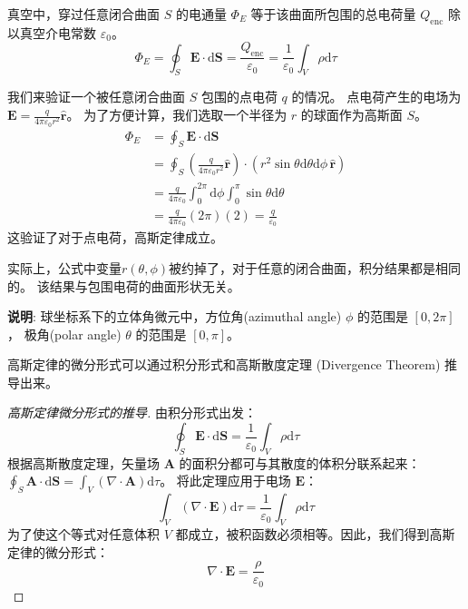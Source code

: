 \documentclass[fontset=none]{ctexart}
\begin{document}
\begin{law}
    真空中，穿过任意闭合曲面 $S$ 的电通量 $\Phi_E$ 等于该曲面所包围的总电荷量 $Q_{\text{enc}}$ 
    除以真空介电常数 $\varepsilon_0$。
    \begin{equation}
        \Phi_E = \oint_S \bm{E} \cdot \mathrm{d}\bm{S} = \frac{Q_{\text{enc}}}{\varepsilon_0} 
        = \frac{1}{\varepsilon_0} \int_V \rho \mathrm{d}\tau
    \end{equation}
\end{law}

\begin{example}[点电荷的电通量]
    我们来验证一个被任意闭合曲面 $S$ 包围的点电荷 $q$ 的情况。
    点电荷产生的电场为 $\bm{E} = \frac{q}{4\pi\varepsilon_0 r^2} \hat{\bm{r}}$。
    为了方便计算，我们选取一个半径为 $r$ 的球面作为高斯面 $S$。
    \begin{equation}
    \begin{aligned}
        \Phi_E &= \oint_S \bm{E} \cdot \mathrm{d}\bm{S} \\
        &= \oint_S \left(\frac{q}{4\pi\varepsilon_0 r^2} \hat{\bm{r}}\right) 
        \cdot (r^2 \sin\theta \mathrm{d}\theta \mathrm{d}\phi \, \hat{\bm{r}}) \\
        &= \frac{q}{4\pi\varepsilon_0} \int_{0}^{2\pi} \mathrm{d}\phi 
        \int_{0}^{\pi} \sin\theta \mathrm{d}\theta \\
        &= \frac{q}{4\pi\varepsilon_0} (2\pi) (2) = \frac{q}{\varepsilon_0}
    \end{aligned}
    \end{equation}
    这验证了对于点电荷，高斯定律成立。

    实际上，公式中变量$r(\theta, \phi)$被约掉了，对于任意的闭合曲面，积分结果都是相同的。
    该结果与包围电荷的曲面形状无关。

    \textbf{说明}: 球坐标系下的立体角微元中，方位角(azimuthal angle) $\phi$ 的范围是 $[0, 2\pi]$，
    极角(polar angle) $\theta$ 的范围是 $[0, \pi]$。
\end{example}

高斯定律的微分形式可以通过积分形式和高斯散度定理 (Divergence Theorem) 推导出来。
\begin{proof}[高斯定律微分形式的推导]
    由积分形式出发：
    \begin{equation}
        \oint_S \bm{E} \cdot \mathrm{d}\bm{S} = \frac{1}{\varepsilon_0} \int_V \rho \mathrm{d}\tau
    \end{equation}
    根据高斯散度定理，矢量场 $\bm{A}$ 的面积分都可与其散度的体积分联系起来： 
    $\oint_S \bm{A} \cdot \mathrm{d}\bm{S} = \int_V (\nabla \cdot \bm{A}) \mathrm{d}\tau$。
    将此定理应用于电场 $\bm{E}$：
    \begin{equation}
        \int_V (\nabla \cdot \bm{E}) \mathrm{d}\tau = \frac{1}{\varepsilon_0} \int_V \rho \mathrm{d}\tau
    \end{equation}
    为了使这个等式对任意体积 $V$ 都成立，被积函数必须相等。因此，我们得到高斯定律的微分形式：
    \begin{equation}
        \nabla \cdot \bm{E} = \frac{\rho}{\varepsilon_0}
    \end{equation}
\end{proof}
\end{document}
